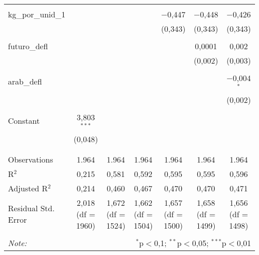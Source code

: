 \begin{table}[!htbp]
\begin{tabular}{@{\extracolsep{5pt}}lcccccc}
  & & & & & & \\ 
 kg\_por\_unid\_1 &  &  &  & $-$0,447 & $-$0,448 & $-$0,426 \\ 
  &  &  &  & (0,343) & (0,343) & (0,343) \\ 
  & & & & & & \\ 
 futuro\_defl &  &  &  &  & 0,0001 & 0,002 \\ 
  &  &  &  &  & (0,002) & (0,003) \\ 
  & & & & & & \\ 
 arab\_defl &  &  &  &  &  & $-$0,004$^{*}$ \\ 
  &  &  &  &  &  & (0,002) \\ 
  & & & & & & \\ 
 Constant & 3,803$^{***}$ &  &  &  &  &  \\ 
  & (0,048) &  &  &  &  &  \\ 
  & & & & & & \\ 
\hline \\[-1.8ex] 
Observations & 1.964 & 1.964 & 1.964 & 1.964 & 1.964 & 1.964 \\ 
R$^{2}$ & 0,215 & 0,581 & 0,592 & 0,595 & 0,595 & 0,596 \\ 
Adjusted R$^{2}$ & 0,214 & 0,460 & 0,467 & 0,470 & 0,470 & 0,471 \\ 
Residual Std. Error & 2,018 (df = 1960) & 1,672 (df = 1524) & 1,662 (df = 1504) & 1,657 (df = 1500) & 1,658 (df = 1499) & 1,656 (df = 1498) \\ 
\hline 
\hline \\[-1.8ex] 
\textit{Note:}  & \multicolumn{6}{r}{$^{*}$p$<$0,1; $^{**}$p$<$0,05; $^{***}$p$<$0,01} \\ 
\end{tabular} 
\end{table} 
